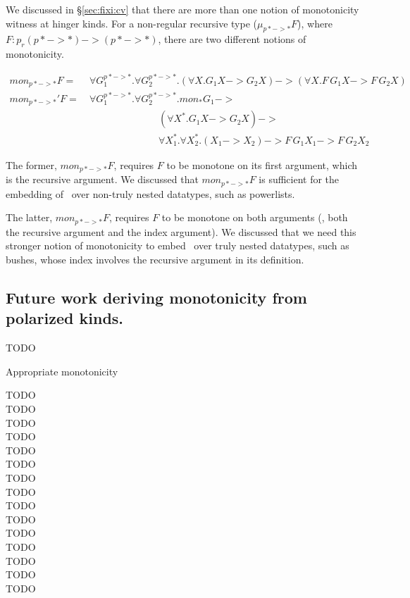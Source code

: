 We discussed in \S\ref{sec:fixi:cv} that there are more than one notion of
monotonicity witness at hinger kinds. For a non-regular recursive type
($\mu_{p* -> *} F$), where $F : p_r(p* -> *) -> (p* -> *)$, there are
two different notions of monotonicity.\vspace*{-1.5em}
\begin{singlespace}
\begin{align*}
\textit{mon}_{p* -> *}F =~&
	\forall G_1^{p* -> *}.\forall G_2^{p* -> *}.
	(\forall X. G_1 X -> G_2 X) -> (\forall X.F\,G_1 X -> F\,G_2 X)
	\\[1mm]
\textit{mon}_{p* -> *}'F =~&
	\forall G_1^{p* -> *}.\forall G_2^{p* -> *}.
		mon_{*} G_1 -> \\ & \qquad\qquad\qquad\quad
		(\forall X^{*}. G_1 X -> G_2 X) -> \\ & \qquad\qquad\qquad\quad
		\forall X_1^{*}.\forall X_2^{*}.
		(X_1 -> X_2) -> F\,G_1 X_1 -> F\,G_2 X_2
\end{align*}
\end{singlespace}
The former, $\textit{mon}_{p* -> *}F$, requires $F$ to be monotone
on its first argument, which is the recursive argument.
We discussed that $\textit{mon}_{p* -> *}F$ is sufficient
for the embedding of \McvPr\ over non-truly nested datatypes,
such as powerlists.

The latter, $\textit{mon}_{p* -> *}F$, requires $F$ to be monotone
on both arguments (\ie, both the recursive argument and the index argument).
We discussed that we need this stronger notion of monotonicity
to embed \McvPr\ over truly nested datatypes, such as bushes,
whose index involves the recursive argument in its definition.

\subsection*{Future work deriving monotonicity from polarized kinds.}
TODO

Appropriate monotonicity

TODO \\ 
TODO \\ 
TODO \\ 
TODO \\ 
TODO \\ 
TODO \\ 
TODO \\ 
TODO \\ 
TODO \\ 
TODO \\ 
TODO \\ 
TODO \\ 
TODO \\ 
TODO \\ 
TODO \\ 


